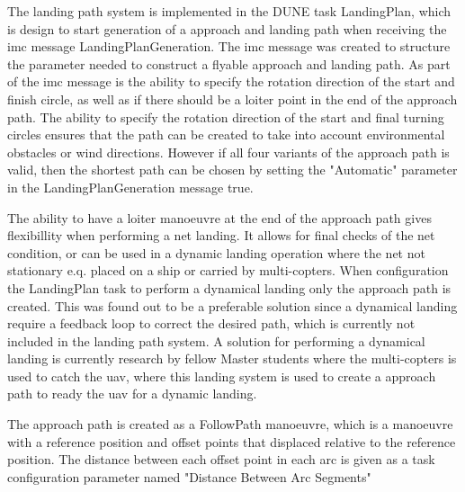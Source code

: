 The landing path system is implemented in the DUNE task LandingPlan, which is design to start generation of a approach and landing path when receiving the \gls{imc} message LandingPlanGeneration.  The \gls{imc} message was created to structure the parameter needed to construct a flyable approach and landing path. As part of the \gls{imc} message is the ability to specify the rotation direction of the start and finish circle, as well as if there should be a loiter point in the end of the approach path. The ability to specify the rotation direction of the start and final turning circles ensures that the path can be created to take into account environmental obstacles or wind directions. However if all four variants of the approach path is valid, then the shortest path can be chosen by setting the "Automatic" parameter in the LandingPlanGeneration message true. 

The ability to have a loiter manoeuvre at the end of the approach path gives flexibillity when performing a net landing. It allows for final checks of the net condition, or can be used in a dynamic landing operation where the net not stationary e.q. placed on a ship or carried by multi-copters. When configuration the LandingPlan task to perform a dynamical landing only the approach path is created. This was found out to be a preferable solution since a dynamical landing require a feedback loop to correct the desired path, which is currently not included in the landing path system. A solution for performing a dynamical landing is currently research by fellow Master students where the multi-copters is used to catch the \gls{uav}, where this landing system is used to create a approach path to ready the \gls{uav} for a dynamic landing.

The approach path is created as a FollowPath manoeuvre, which is a manoeuvre with a reference position and offset points that displaced relative to the reference position. The distance between each offset point in each arc is given as a task configuration parameter named "Distance Between Arc Segments"
